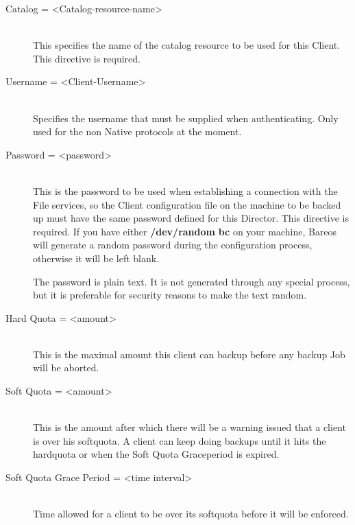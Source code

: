 \begin{description}
\item [Catalog = {\textless}Catalog-resource-name{\textgreater}] \hfill \\
This specifies the  name of the catalog resource to be used for this Client.
This directive is required.

\item [Username = {\textless}Client-Username{\textgreater}] \hfill \\
Specifies the username that must be supplied when authenticating.
Only used for the non Native protocols at the moment.

\item [Password = {\textless}password{\textgreater}] \hfill \\
This is the password to be  used when establishing a connection with the File
services, so  the Client configuration file on the machine to be backed up
must  have the same password defined for this Director. This directive is
required.  If you have either {\bf /dev/random}  {\bf bc} on your machine,
Bareos will generate a random  password during the configuration process,
otherwise it will  be left blank.

The password is plain text.  It is not generated through any special
process, but it is preferable for security reasons to make the text
random.

\item [Hard Quota = {\textless}amount{\textgreater}] \hfill \\
This is the maximal amount this client can backup before any backup Job
will be aborted.

\item [Soft Quota = {\textless}amount{\textgreater}] \hfill \\
This is the amount after which there will be a warning issued that a client
is over his softquota. A client can keep doing backups until it hits the
hardquota or when the Soft Quota Graceperiod is expired.

\item [Soft Quota Grace Period = {\textless}time interval{\textgreater}] \hfill \\
Time allowed for a client to be over its softquota before it will be enforced.


\end{description}
